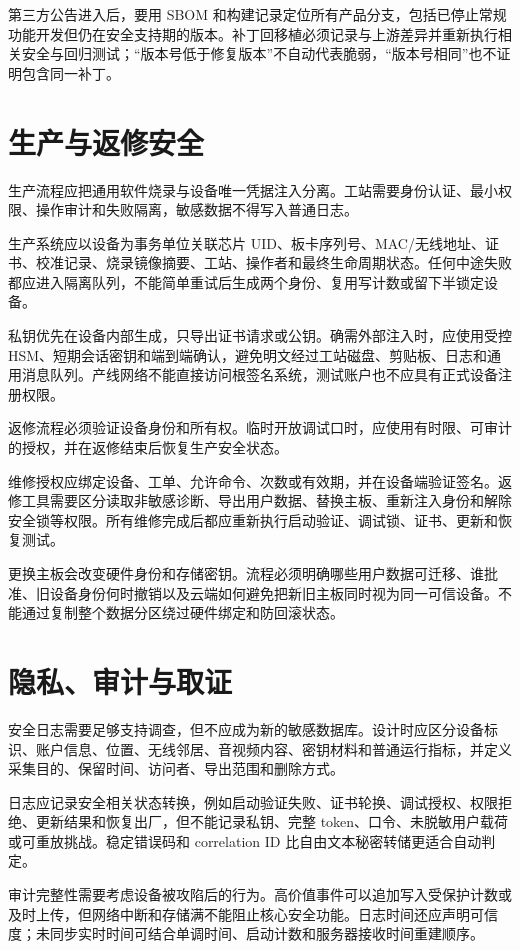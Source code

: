第三方公告进入后，要用 SBOM 和构建记录定位所有产品分支，包括已停止常规功能开发但仍在安全支持期的版本。补丁回移植必须记录与上游差异并重新执行相关安全与回归测试；“版本号低于修复版本”不自动代表脆弱，“版本号相同”也不证明包含同一补丁。

\section{生产与返修安全}

生产流程应把通用软件烧录与设备唯一凭据注入分离。工站需要身份认证、最小权限、操作审计和失败隔离，敏感数据不得写入普通日志。

生产系统应以设备为事务单位关联芯片 UID、板卡序列号、MAC/无线地址、证书、校准记录、烧录镜像摘要、工站、操作者和最终生命周期状态。任何中途失败都应进入隔离队列，不能简单重试后生成两个身份、复用写计数或留下半锁定设备。

私钥优先在设备内部生成，只导出证书请求或公钥。确需外部注入时，应使用受控 HSM、短期会话密钥和端到端确认，避免明文经过工站磁盘、剪贴板、日志和通用消息队列。产线网络不能直接访问根签名系统，测试账户也不应具有正式设备注册权限。

返修流程必须验证设备身份和所有权。临时开放调试口时，应使用有时限、可审计的授权，并在返修结束后恢复生产安全状态。

维修授权应绑定设备、工单、允许命令、次数或有效期，并在设备端验证签名。返修工具需要区分读取非敏感诊断、导出用户数据、替换主板、重新注入身份和解除安全锁等权限。所有维修完成后都应重新执行启动验证、调试锁、证书、更新和恢复测试。

更换主板会改变硬件身份和存储密钥。流程必须明确哪些用户数据可迁移、谁批准、旧设备身份何时撤销以及云端如何避免把新旧主板同时视为同一可信设备。不能通过复制整个数据分区绕过硬件绑定和防回滚状态。

\section{隐私、审计与取证}

安全日志需要足够支持调查，但不应成为新的敏感数据库。设计时应区分设备标识、账户信息、位置、无线邻居、音视频内容、密钥材料和普通运行指标，并定义采集目的、保留时间、访问者、导出范围和删除方式。

日志应记录安全相关状态转换，例如启动验证失败、证书轮换、调试授权、权限拒绝、更新结果和恢复出厂，但不能记录私钥、完整 token、口令、未脱敏用户载荷或可重放挑战。稳定错误码和 correlation ID 比自由文本秘密转储更适合自动判定。

审计完整性需要考虑设备被攻陷后的行为。高价值事件可以追加写入受保护计数或及时上传，但网络中断和存储满不能阻止核心安全功能。日志时间还应声明可信度；未同步实时时间可结合单调时间、启动计数和服务器接收时间重建顺序。

